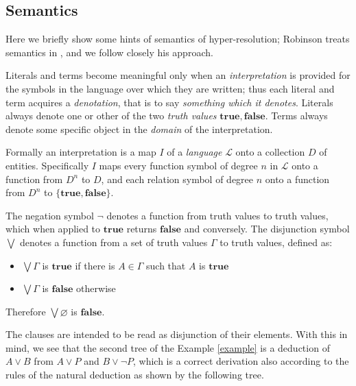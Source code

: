 \documentclass[a4paper,12pt,oneside]{book}
\let\emptyset\varnothing
\let\o\vee
\begin{document}
\subsection*{Semantics}

Here we briefly show some hints of semantics of hyper-resolution; Robinson treats semantics in \cite{robinson-general}, and we follow closely his approach.

Literals and terms become meaningful only when an \textit{interpretation} is provided for the symbols in the language over which they are written; thus each literal and term acquires a \textit{denotation}, that is to say \textit{something which it denotes}.
Literals always denote one or other of the two \textit{truth values} $\mathbf{true, false}$. 
Terms always denote some specific object in the \textit{domain} of the interpretation. 

Formally an interpretation is a map $I$ of a \textit{language} $\mathscr{L}$ onto a collection $D$ of entities. Specifically $I$ maps every function symbol of degree $n$ in $\mathscr{L}$ onto a function from $D^n$ to $D$, and each relation symbol of degree $n$ onto a function from $D^n$ to $\{\mathbf{true, false}\}$. 

The negation symbol $\neg$ denotes a function from truth values to truth values, which when applied to $\mathbf{true}$ returns $\mathbf{false}$ and conversely. The disjunction symbol $\bigvee$ denotes a function from a set of truth values $\Gamma$ to truth values, defined as:
\begin{itemize}
\item $\bigvee \Gamma$ is $\mathbf{true}$ if there is $A\in\Gamma$ such that $A$ is $\mathbf{true}$
\item  $\bigvee \Gamma$ is $\mathbf{false}$ otherwise
\end{itemize}
Therefore $\bigvee\emptyset$ is $\mathbf{false}$.

\newpage
The clauses are intended to be read as disjunction of their elements. With this in mind, we see that the second tree of the Example \ref{example} is a deduction of $A\o B$ from $A\o P$ and $B\o \neg P$, which is a correct derivation also according to the rules of the natural deduction as shown by the following tree.
\end{document}
